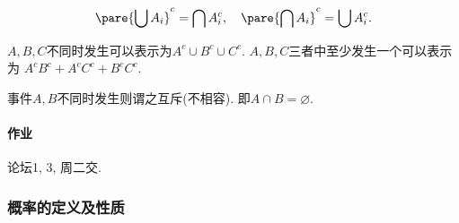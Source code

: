 \documentclass[../Statistics.tex]{subfiles}
\begin{document}
\begin{theorem}[De Morgan律]
    \[ \pare{\bigcup A_i}^c = \bigcap A_i^c,\quad \pare{\bigcap A_i}^c = \bigcup A_i^c. \]
\end{theorem}
\begin{sample}
    \begin{ex}
        $A,B,C$不同时发生可以表示为$A^c\cup B^c \cup C^c$. $A,B,C$三者中至少发生一个可以表示为
    $A^cB^c + A^cC^c + B^cC^c$.
    \end{ex}
\end{sample}
\begin{definition}[事件的互斥]
    事件$A,B$不同时发生则谓之互斥(不相容). 即$A\cap B = \varnothing$.
\end{definition}

\paragraph{作业} %
\label{par:作业}

论坛1, 3, 周二交.


\subsubsection{概率的定义及性质} %
\label{ssub:概率的定义及性质}
\end{document}
